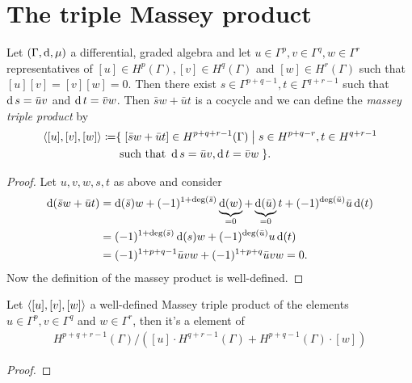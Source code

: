 
\section{The triple Massey product}

\begin{DefLem}
	Let $ (\Gamma,\operatorname{d},\mu) $ a differential, graded
	algebra and let $ u\in\Gamma^p,v\in\Gamma^q,w\in\Gamma^r $ representatives of $ [u]\in H^p(\Gamma),[v]\in H^q(\Gamma) $
	and $ [w]\in H^r(\Gamma) $ such that $ [u][v] = [v][w] = 0 $.
	Then there exist $ s\in\Gamma^{p+q-1}, t\in\Gamma^{q+r-1} $ 
	such that $ \operatorname{d} s =\bar{u}v $ and $  \operatorname{d} t= \bar{v}w $. Then
	$ \bar{s}w + \bar{u}t$ is a cocycle and we can define the \textit{massey triple product} by
	\begin{align*}
	\langle [u],[v],[w] \rangle \coloneqq &\{ \;[\bar{s}w + \bar{u}t]\in H^{p+q+r-1}(\Gamma) \;\big|\; s\in H^{p+q-r},t\in H^{q+r-1} \\
	&\text{ such that } \operatorname{d} s = \bar{u}v,\operatorname{d} t = \bar{v}w \;\}.
	\end{align*} 
	\begin{proof}
		Let $ u,v,w,s,t $ as above and consider 
		\begin{align*}
		\operatorname{d} (\bar{s}w + \bar{u}t) &=  \operatorname{d}(\bar{s})w + (-1)^{1+\deg(\bar{s})} \underbrace{\operatorname{d}(w)}_{=0} + \underbrace{\operatorname{d}(\bar{u})}_{=0}t + (-1)^{\deg(\bar{u})} \bar{u} \operatorname{d}(t) \\
		&= (-1)^{1+\deg(\bar{s})} \operatorname{d}(s) w + (-1)^{\deg(\bar{u})} u\operatorname{d}(t)  \\
		&=  (-1)^{1+p+q-1} \bar{u}vw + (-1)^{1+p+q} \bar{u}vw = 0.\\
		\end{align*}
		Now the definition of the massey product is well-defined.
	\end{proof}
\end{DefLem}

\begin{Thm}
	Let $ \langle [u],[v],[w] \rangle $ a well-defined Massey triple product of
	the elements $ u\in\Gamma^p,v\in\Gamma^q$ and $ w\in\Gamma^r $,
	then it's a element of 
	\begin{gather*}
			 H^{p+q+r-1}(\Gamma) / \left([u]\cdot H^{q+r-1}(\Gamma) + H^{p+q-1}(\Gamma)\cdot [w] \right)
	\end{gather*}
	\begin{proof}
	\end{proof}
\end{Thm}


